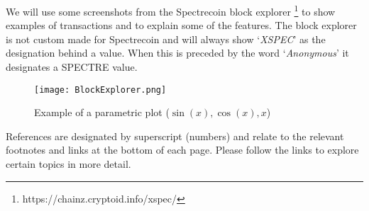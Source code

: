 We will use some screenshots from the Spectrecoin block explorer
\footnote{https://chainz.cryptoid.info/xspec/} to show examples of
transactions and to explain some of the features. The block explorer
is not custom made for Spectrecoin and will always show ‘\textit{XSPEC}’
as the designation behind a value. When this is preceded by the word
‘\textit{Anonymous}’ it designates a SPECTRE value.

\begin{figure}[h]
	\caption{Example of a parametric plot ($\sin (x), \cos(x), x$)}
	\centering
	\texttt{[image: BlockExplorer.png]}
\end{figure}


References are designated by superscript (numbers) and relate to the relevant
footnotes and links at the bottom of each page. Please follow the links to
explore certain topics in more detail.
